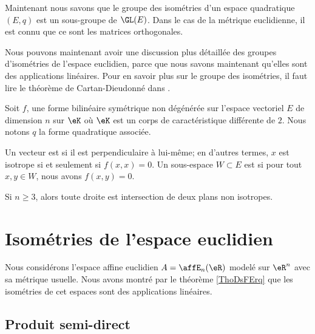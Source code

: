 Maintenant nous savons que le groupe des isométries d'un espace quadratique \( (E,q)\) est un sous-groupe de \( \GL(E)\). Dans le cas de la métrique euclidienne, il est connu que ce sont les matrices orthogonales.

Nous pouvons maintenant avoir une discussion plus détaillée des groupes d'isométries de l'espace euclidien, parce que nous savons maintenant qu'elles sont des applications linéaires. Pour en savoir plus sur le groupe des isométries, il faut lire le théorème de Cartan-Dieudonné dans \cite{JGAdTA}.

Soit \( f\), une forme bilinéaire symétrique non dégénérée  sur l'espace vectoriel \( E\) de dimension \( n\) sur \( \eK\) où \( \eK\) est un corps de caractéristique différente de \( 2\). Nous notons \( q\) la forme quadratique associée.

Un vecteur est  si il est perpendiculaire à lui-même; en d'autres termes, \( x\) est isotrope si et seulement si \( f(x,x)=0\). Un sous-espace \( W\subset E\) est  si pour tout \( x,y\in W\), nous avons \( f(x,y)=0\).

\begin{lemma}
    Si \( n\geq 3\), alors toute droite est intersection de deux plans non isotropes.
\end{lemma}

\section{Isométries de l'espace euclidien}

Nous considérons l'espace affine euclidien \( A=\affE_n(\eR)\) modelé sur \( \eR^n\) avec sa métrique usuelle. Nous avons montré par le théorème \ref{ThoDsFErq} que les isométries de cet espaces sont des applications linéaires.

\subsection{Produit semi-direct}


